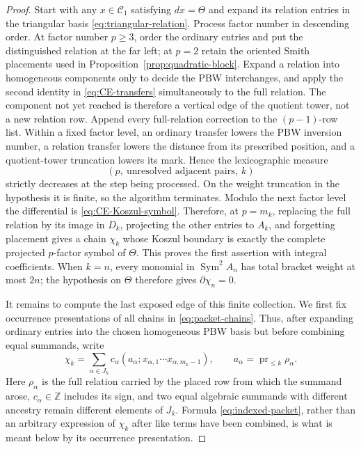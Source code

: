 \documentclass[11pt]{amsart}
\theoremstyle{remark}
\newcommand{\Z}{\mathbb Z}
\newcommand{\Sym}{\operatorname{Sym}}
\newcommand{\pr}{\operatorname{pr}}
\begin{document}
\begin{proof}
Start with any $x\in\mathcal C_1$ satisfying $dx=\Theta$ and expand its
relation entries in the triangular basis
\eqref{eq:triangular-relation}.  Process
factor number in descending order.  At factor number $p\geq3$, order
the ordinary entries and put the distinguished relation at the far
left; at $p=2$ retain the oriented Smith placements used in
Proposition~\ref{prop:quadratic-block}.  Expand a relation into
homogeneous components only to decide the PBW interchanges, and apply
the second identity in \eqref{eq:CE-transfers} simultaneously to the
full relation.  The component not yet reached is therefore a vertical
edge of the quotient tower, not a new relation row.  Append every
full-relation correction to the $(p-1)$-row list.  Within a fixed
factor level, an ordinary transfer lowers the PBW inversion number, a
relation transfer lowers the distance from its prescribed position,
	and a quotient-tower truncation lowers its mark.  Hence the
	lexicographic measure
	\[
	 (p,\ \text{unresolved adjacent pairs},\ k)
	\]
	strictly decreases at the step being processed.  On the weight
	truncation in the hypothesis it is finite, so the algorithm terminates.
Modulo the next factor level the differential is
\eqref{eq:CE-Koszul-symbol}.  Therefore, at $p=m_k$, replacing the full
relation by its image in $D_k$, projecting the other entries to $A_k$,
and forgetting placement gives a chain $\chi_k$ whose Koszul boundary is
exactly the complete projected $p$-factor symbol of $\Theta$.  This
proves the first assertion with integral coefficients.  When $k=n$,
every monomial in $\Sym^2A_n$ has total bracket weight at most $2n$;
the hypothesis on $\Theta$ therefore gives $\partial\chi_n=0$.

	It remains to compute the last exposed edge of this finite collection.
	We first fix occurrence presentations of all chains in
	\eqref{eq:packet-chains}.  Thus, after expanding ordinary entries into
	the chosen homogeneous PBW basis but before combining equal summands,
	write
	\begin{equation}\label{eq:indexed-packet}
	 \chi_k=\sum_{\alpha\in J_k}c_\alpha
	 (a_\alpha;x_{\alpha,1}\cdots x_{\alpha,m_k-1}),
	 \qquad a_\alpha=\pr_{\leq k}\rho_\alpha.
	\end{equation}
	Here $\rho_\alpha$ is the full relation carried by the placed row from
	which the summand arose, $c_\alpha\in\Z$ includes its sign, and two
	equal algebraic summands with different ancestry remain different
	elements of $J_k$.  Formula \eqref{eq:indexed-packet}, rather than an
	arbitrary expression of $\chi_k$ after like terms have been combined,
	is what is meant below by its occurrence presentation.


\end{proof}
\end{document}
